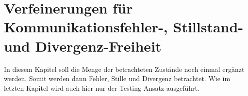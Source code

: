 \chapter{Verfeinerungen für Kommunikationsfehler-, Stillstand- und
Divergenz-Freiheit}

In diesem Kapitel soll die Menge der betrachteten Zustände noch einmal
ergänzt werden. Somit werden dann Fehler, Stille und Divergenz betrachtet. Wie
im letzten Kapitel wird auch hier nur der Testing-Ansatz ausgeführt.






